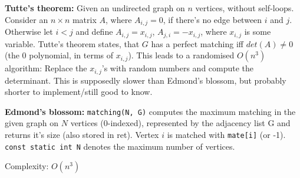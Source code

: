 \textbf{Tutte's theorem:} Given an undirected graph on $n$ vertices, without self-loops. Consider an $n \times n$ matrix $A$, where $A_{i,j} = 0$, if there's no edge between $i$ and $j$. Otherwise let $i < j$ and define $A_{i,j} = x_{i,j}$, $A_{j,i} = -x_{i,j}$, where $x_{i,j}$ is some variable. Tutte's theorem states, that $G$ has a perfect matching iff $det(A) \ne 0$ (the $0$ polynomial, in terms of $x_{i,j}$). This leads to a randomised $O(n^3)$ algorithm: Replace the $x_{i,j}$'s with random numbers and compute the determinant. This is supposedly slower than Edmond's blossom, but probably shorter to implement/still good to know.

\textbf{Edmond's blossom:} \lstinline{matching(N, G)} computes the maximum matching in the given graph on $N$ vertices (0-indexed), represented by the adjacency list G and returns it's size (also stored in ret). Vertex $i$ is matched with \lstinline{mate[i]} (or -1). \lstinline{const static int N} denotes the maximum number of vertices. 

Complexity: $O(n^3)$
